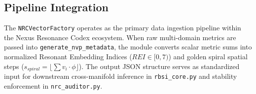\subsection{Pipeline Integration}
The \texttt{NRCVectorFactory} operates as the primary data ingestion pipeline within the Nexus Resonance Codex ecosystem. When raw multi-domain metrics are passed into \texttt{generate\_nvp\_metadata}, the module converts scalar metric sums into normalized Resonant Embedding Indices ($REI \in [0, 7)$) and golden spiral spatial steps ($s_{spiral} = \lfloor \sum v_i \cdot \phi \rfloor$). The output JSON structure serves as standardized input for downstream cross-manifold inference in \texttt{rbsi\_core.py} and stability enforcement in \texttt{nrc\_auditor.py}.
